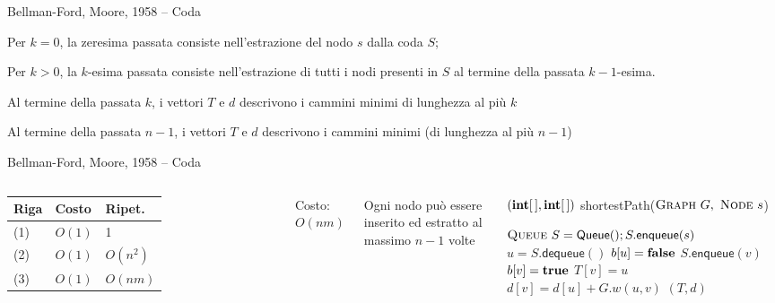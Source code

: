 \begin{frame}{Bellman-Ford, Moore, 1958 -- Coda}

\vspace{-9pt}
\begin{myboxtitle}
\BIL
\item Per $k=0$, la zeresima passata consiste nell'estrazione del nodo $s$ dalla coda $S$;
\item Per $k>0$, la $k$-esima passata consiste nell'estrazione di tutti i nodi 
presenti in $S$ al termine della passata $k-1$-esima.
\EIL
\end{myboxtitle}

\begin{myboxtitle}
\BIL
\item Al termine della passata $k$, i vettori $T$ e $d$ descrivono i cammini minimi di
lunghezza al più $k$ 
\item Al termine della passata $n-1$, i vettori $T$ e $d$ descrivono i cammini minimi
(di lunghezza al più $n-1$)
\EIL
\end{myboxtitle}

\end{frame}

\begin{frame}{Bellman-Ford, Moore, 1958 -- Coda}


\vspace{-9pt}

\begin{columns}

\begingroup
\renewcommand*{\arraystretch}{1.2}
\begin{tabular}{|l|l|l|}
\hline
Riga & Costo & Ripet. \\\hline
(1) & $O(1)$ & 1 \\\hline
(2) & $O(1)$ & $O(n^2)$ \\\hline
(3) & $O(1)$ & $O(nm)$ \\\hline
\end{tabular}
\endgroup

\medskip
Costo: \alert{$O(nm)$}

\medskip
Ogni nodo può essere inserito ed estratto al massimo $n-1$ volte

\vspace{-12pt}
\footnotesize
\begin{Procedure}
\caption[A]{\footnotesize $(\INTARRAY, \INTARRAY)$ \textsf{shortestPath}($\textsc{Graph}\ G,\ \textsc{Node}\ s$)}
\alert{$\textsc{Queue}\ S = \textsf{Queue}(); S.\textsf{enqueue}(s)$}\;
{
  \alert{$u = S.\textsf{dequeue}()$}\;
  $b[u] = \FALSE$\;
  {
    {
      {
        \alert{$S.\textsf{enqueue}(v)$}\;
        $b[v] = \TRUE$\;
      }
      $T[v] = u$\;
      $d[v] = d[u] + G.w(u,v)$\;
    }
  }
}
\Return $(T,d)$
\end{Procedure}
\end{columns}

\end{frame}

